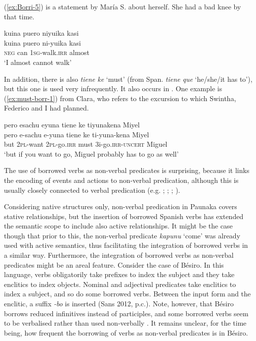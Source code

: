 (\ref{ex:Borri-5}) is a statement by María S. about herself. She had a bad knee by that time.

\ea\label{ex:Borri-5}
\begingl
\glpreamble kuina puero niyuika kasi\\
\gla kuina puero ni-yuika kasi\\
\glb \textsc{neg} can 1\textsc{sg}-walk.\textsc{irr} almost\\
\glft ‘I almost cannot walk’
\endgl
\trailingcitation{[rxx-e181017l.011]}
\xe
{}

In addition, there is also \textit{tiene ke} ‘must’ (from Span. \textit{tiene que} ‘he/she/it has to’), but this one is used very infrequently. It also occurs in  \citep[cf. Bésiro text examples in][47--70]{Sans2013}. One example is (\ref{ex:must-borr-1}) from Clara, who refers to the excursion to  which Swintha, Federico and I had planned.

\ea\label{ex:must-borr-1}
\begingl
\glpreamble pero esachu eyuna tiene ke tiyunakena Miyel\\
\gla pero e-sachu e-yuna {tiene ke} ti-yuna-kena Miyel\\
\glb but 2\textsc{pl}-want 2\textsc{pl}-go.\textsc{irr} must 3i-go.\textsc{irr}-\textsc{uncert} Miguel\\
\glft ‘but if you want to go, Miguel probably has to go as well’
\endgl
\trailingcitation{[cux-c120414ls-1.139]}
\xe
{}

The use of borrowed verbs as non-verbal predicates is surprising, because it links the encoding of events and actions to non-verbal predication, although this is usually closely connected to verbal predication (e.g. \citealt[189, 244]{Langacker1987}; \citealt[140, 142]{Frawley1992}; \citealt[82--83]{VanValinLaPolla1997}; \citealt[52]{Givon2001}).

Considering native structures only, non-verbal predication in Paunaka covers stative relationships, but the insertion of borrowed Spanish verbs has extended the semantic scope to include also active relationships. It might be the case though that prior to this, the non-verbal predicate \textit{kapunu} ‘come’ was already used with active semantics, thus facilitating the integration of borrowed verbs in a similar way. Furthermore, the integration of borrowed verbs as non-verbal predicates might be an areal feature. Consider the case of Bésiro. In this language, verbs obligatorily take prefixes to index the subject and they take enclitics to index objects. Nominal and adjectival predicates take enclitics to index a subject, and so do some borrowed verbs. Between the input form and the enclitic, a suffix \textit{-bo} is inserted (Sans 2012, p.c.). Note, however, that Bésiro borrows reduced infinitives instead of participles, and some borrowed verbs seem to be verbalised rather than used non-verbally \citep[cf. Bésiro texts in][47--70]{Sans2013}. It remains unclear, for the time being, how frequent the borrowing of verbs as non-verbal predicates is in Bésiro.

